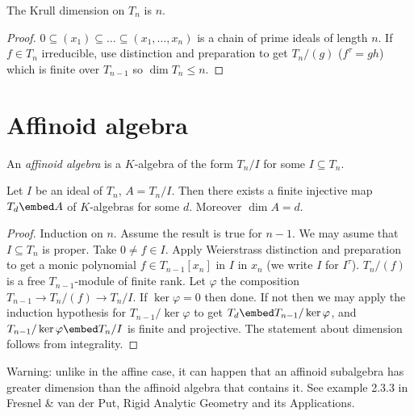 \documentclass[a4paper]{article}
\begin{document}
\begin{proposition}
  The Krull dimension on \(T_n\) is \(n\).
\end{proposition}

\begin{proof}
  \(0 \subseteq (x_1) \subseteq \dots \subseteq (x_1, \dots, x_n)\) is a chain of prime ideals of length \(n\). If \(f \in T_n\) irreducible, use distinction and preparation to get \(T_n/(g)\) (\(f^\tau = gh\)) which is finite over \(T_{n - 1}\) so \(\dim T_n \leq n\).
\end{proof}

\section{Affinoid algebra}

\begin{definition}
  An \emph{affinoid algebra} is a \(K\)-algebra of the form \(T_n/I\) for some \(I \subseteq T_n\).
\end{definition}

\begin{theorem}
  Let \(I\) be an ideal of \(T_n\), \(A = T_n/I\). Then there exists a finite injective map \(T_d \embed A\) of \(K\)-algebras for some \(d\). Moreover \(\dim A = d\).
\end{theorem}

\begin{proof}
  Induction on \(n\). Assume the result is true for \(n - 1\). We may asume that \(I \subseteq T_n\) is proper. Take \(0 \ne f \in I\). Apply Weierstrass distinction and preparation to get a monic polynomial \(f \in T_{n - 1}[x_n]\) in \(I\) in \(x_n\) (we write \(I\) for \(I^\tau\)). \(T_n/(f)\) is a free \(T_{n - 1}\)-module of finite rank. Let \(\varphi\) the composition \(T_{n - 1} \to T_n/(f) \to T_n/I\). If \(\ker \varphi = 0\) then done. If not then we may apply the induction hypothesis for \(T_{n - 1}/\ker \varphi\) to get \(T_d \embed T_{n - 1}/\ker \varphi\), and \(T_{n - 1}/\ker \varphi \embed T_n/I\) is finite and projective. The statement about dimension follows from integrality.
\end{proof}

\begin{remark}
  Warning: unlike in the affine case, it can happen that an affinoid subalgebra has greater dimension than the affinoid algebra that contains it. See example 2.3.3 in Fresnel \& van der Put, Rigid Analytic Geometry and its Applications.
\end{remark}
\end{document}
